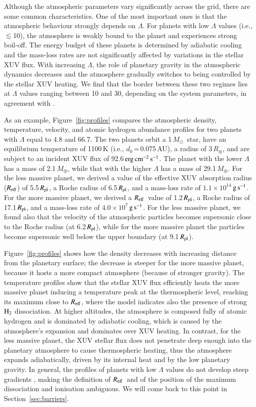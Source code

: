 \documentclass{aa}
\def\Reff{$R_{\rm eff}$}
\def\hh{{\rm H_2}}
\def\ergscm{$\rm erg\,cm^{-2}\,s^{-1}$}
\def\Rpl{$R_{\rm pl}$}
\def\Re{\ensuremath{R_{\oplus}}}
\def\Me{\ensuremath{M_{\oplus}}}
\def\Mo{\ensuremath{M_{\odot}}}
\def\gs{$\rm g\,s^{-1}$}
\begin{document}
Although the atmospheric parameters vary significantly across the
grid, there are some common characteristics. One of the most
important ones is that the atmospheric behaviour strongly depends
on $\Lambda$. For planets with low $\Lambda$ values (i.e.,
$\lesssim$10), the atmosphere is weakly bound to the planet and
experiences strong boil-off. {The energy budget of these planets
is determined by adiabatic cooling and the mass-loss rates are not
significantly affected by variations in the stellar XUV} flux.
With increasing $\Lambda$, the role of planetary gravity in the
atmospheric dynamics decreases and the atmosphere gradually
switches to being controlled by the stellar XUV heating. We find
that the border between these two regimes lies at $\Lambda$ values
ranging between 10 and 30, depending on the system parameters, in
agreement with \citet{fossati2017}.

As an example, Figure~\ref{fig:profiles} compares the atmospheric density, temperature, velocity, and atomic hydrogen abundance profiles for two planets with $\Lambda$ equal to 4.8 and 66.7. The two planets orbit a 1\,\Mo\ star, have an equilibrium temperature of 1100\,K (i.e., $d_0$\,=\,0.075\,AU), a radius of
3\,\Re, and are subject to an incident XUV flux of 92.6\,\ergscm. The planet with the lower $\Lambda$ has a mass of 2.1\,\Me, while that with the higher $\Lambda$ has a mass of 29.1\,\Me. For the less massive planet, we derived a value of the effective XUV absorption radius (\Reff) of 5.5\,\Rpl, a Roche radius of 6.5\,\Rpl, and a mass-loss rate of $1.1\times10^{14}$\,\gs. For the more massive planet, we derived a \Reff\ value of 1.2\,\Rpl, a Roche radius of 17.1\,\Rpl, and a mass-loss rate of $4.0\times10^{7}$\,\gs. For the less massive planet, we found also that the velocity of the atmospheric particles becomes supersonic close to the Roche radius (at 6.2\,\Rpl), while for the more massive planet the particles become supersonic well below the upper boundary (at 9.1\,\Rpl).

Figure~\ref{fig:profiles} shows how the density decreases with increasing distance from the planetary surface; the decrease is steeper for the more massive planet, because it hosts a more compact atmosphere (because of stronger gravity). The temperature profiles show that the stellar XUV flux efficiently heats the more massive planet inducing a temperature peak at the thermospheric
level, reaching its maximum close to \Reff, where the model indicates also the presence of strong $\hh$ dissociation. At higher altitudes, the atmosphere is composed fully of atomic hydrogen and is dominated by adiabatic cooling, which is caused by the atmosphere's expansion and dominates over XUV heating. In contrast, for the less massive planet, the XUV stellar flux does not penetrate deep enough into the planetary atmosphere to cause thermospheric heating, thus the atmosphere expands adiabatically, driven by its internal heat and by the low planetary gravity. In general, the profiles of planets with low $\Lambda$ values do not develop steep gradients \citep[see e.g.,][]{kubyshkina2018}, making the definition of \Reff\ and of the position of the maximum dissociation and ionisation ambiguous. We will come back to this point in Section~\ref{sec:barriers}.
\end{document}
